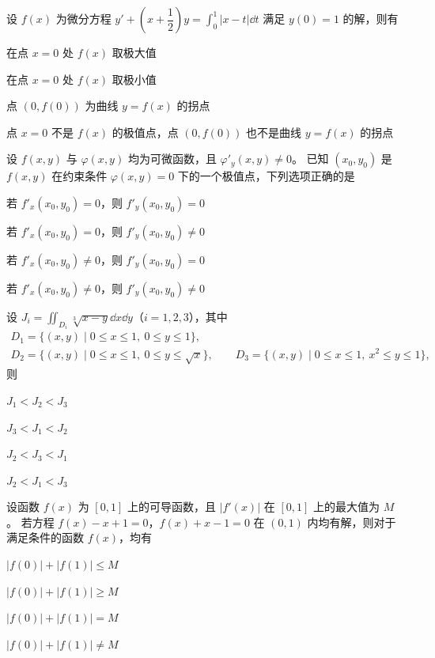 \choiceheading

\begin{question}[index=1]
设 $f(x)$ 为微分方程 $y'+\left(x+\dfrac12\right)y=\displaystyle\int_0^1 |x-t|\dd t$
满足 $y(0)=1$ 的解，则有\paren
\begin{choices}[columns=1]
\item 在点 $x=0$ 处 $f(x)$ 取极大值
\item 在点 $x=0$ 处 $f(x)$ 取极小值
\item 点 $(0,f(0))$ 为曲线 $y=f(x)$ 的拐点
\item 点 $x=0$ 不是 $f(x)$ 的极值点，点 $(0,f(0))$ 也不是曲线 $y=f(x)$ 的拐点
\end{choices}
\end{question}

\begin{question}[index=2]
设 $f(x,y)$ 与 $\varphi(x,y)$ 均为可微函数，且 $\varphi'_y(x,y)\ne 0$。
已知 $(x_0,y_0)$ 是 $f(x,y)$ 在约束条件 $\varphi(x,y)=0$ 下的一个极值点，下列选项正确的是\paren
\begin{choices}[columns=2]
\item 若 $f'_x(x_0,y_0)=0$，则 $f'_y(x_0,y_0)=0$
\item 若 $f'_x(x_0,y_0)=0$，则 $f'_y(x_0,y_0)\ne 0$
\item 若 $f'_x(x_0,y_0)\ne 0$，则 $f'_y(x_0,y_0)=0$
\item 若 $f'_x(x_0,y_0)\ne 0$，则 $f'_y(x_0,y_0)\ne 0$
\end{choices}
\end{question}

\begin{question}[index=3]
设 $J_i=\displaystyle\iint_{D_i}\sqrt[3]{x-y}\dd x\dd y$（$i=1,2,3$），其中
\[
\begin{gathered}
D_1=\{(x,y)\mid 0\le x\le 1,\ 0\le y\le 1\},\\
D_2=\{(x,y)\mid 0\le x\le 1,\ 0\le y\le\sqrt{x}\},\qquad
D_3=\{(x,y)\mid 0\le x\le 1,\ x^2\le y\le 1\},
\end{gathered}
\]
则\paren
\begin{choices}[columns=4]
\item $J_1<J_2<J_3$
\item $J_3<J_1<J_2$
\item $J_2<J_3<J_1$
\item $J_2<J_1<J_3$
\end{choices}
\end{question}

\begin{question}[index=4]
设函数 $f(x)$ 为 $[0,1]$ 上的可导函数，且 $|f'(x)|$ 在 $[0,1]$ 上的最大值为 $M$。
若方程 $f(x)-x+1=0$，$f(x)+x-1=0$ 在 $(0,1)$ 内均有解，则对于满足条件的函数 $f(x)$，均有\paren
\begin{choices}[columns=2]
\item $|f(0)|+|f(1)|\le M$
\item $|f(0)|+|f(1)|\ge M$
\item $|f(0)|+|f(1)|=M$
\item $|f(0)|+|f(1)|\ne M$
\end{choices}
\end{question}

